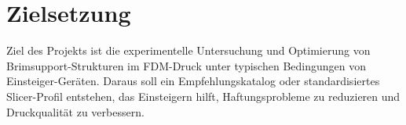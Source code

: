 \chapter{Zielsetzung}
\label{cha:Zielsetzung}

Ziel des Projekts ist die experimentelle Untersuchung und Optimierung von Brimsupport-Strukturen im FDM-Druck unter typischen Bedingungen von Einsteiger-Geräten.
Daraus soll ein Empfehlungskatalog oder standardisiertes Slicer-Profil entstehen, das Einsteigern hilft, Haftungsprobleme zu reduzieren und Druckqualität zu verbessern.